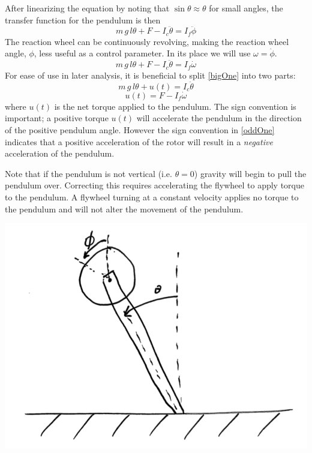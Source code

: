\documentclass[12pt,letterpaper]{article}
\begin{document}
After linearizing the equation by noting that $\sin{\theta} \approx \theta$ for small angles, 
the transfer function for the pendulum is then
%
\begin{equation}
    m \,g \,l \theta + F - I_{c}\ddot{\theta}  = I_{f}\ddot{\phi}
\end{equation}
%
The reaction wheel can be continuously revolving, making the reaction wheel angle, $\phi$, less useful as a control parameter.
In its place we will use $\omega = \dot{\phi}$.
%
\begin{equation}
    m \,g \,l \theta + F - I_{c}\ddot{\theta}  = I_{f}\dot{\omega}\label{bigOne}
\end{equation}
%
For ease of use in later analysis, it is beneficial to split \eqref{bigOne} into two parts:
%
\begin{equation}
    m \,g \,l \theta + u(t)   = I_{c}\ddot{\theta}\label{eq.pendulum}
\end{equation}
%
\begin{equation}
    u(t) = F - I_{f}\dot{\omega}\label{oddOne}
\end{equation}
%
where $u(t)$ is the net torque applied to the pendulum.  The sign convention is important; a positive torque $u(t)$
will accelerate the pendulum in the direction of the positive pendulum angle.  However the sign convention in 
\eqref{oddOne} indicates that  a positive acceleration of the rotor will result in a \textit{negative} acceleration of the pendulum.

Note that if the pendulum is not vertical (i.e. $\theta = 0$) gravity will begin to pull the pendulum over.  Correcting this requires accelerating the flywheel to apply torque to the pendulum.  A flywheel turning at a constant velocity applies no torque to the pendulum and will not alter the movement of the pendulum.



\includegraphics[width=\textwidth]{images/scan1.png}
    \label{modelOfPendulum}
\end{document}
